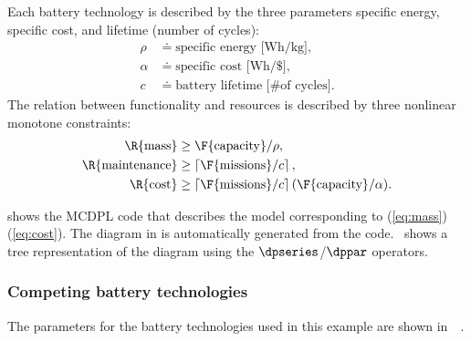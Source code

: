 Each battery technology is described by the three parameters specific
energy, specific cost, and lifetime (number of cycles):
\begin{align*}
\rho & \doteq\text{specific energy [Wh/kg]},\\
\alpha & \doteq\text{specific cost [Wh/\$]},\\
c & \doteq\text{battery lifetime [\# of cycles]}.
\end{align*}
The relation between functionality and resources is described by three
nonlinear monotone constraints: 
\begin{align}
\R{\text{mass}} & \geq\F{\text{capacity}}/\rho,\label{eq:mass}\\
\R{\text{maintenance}} & \geq\left\lceil \F{\text{missions}}/c\right\rceil ,\label{eq:maintenance}\\
\R{\text{cost}} & \geq\left\lceil \F{\text{missions}}/c\right\rceil (\F{\text{capacity}}/\alpha).\label{eq:cost}
\end{align}

 shows the MCDPL code that describes the
model corresponding to (\ref{eq:mass})\textendash (\ref{eq:cost}).
The diagram in  is automatically generated
from the code. ~shows a tree representation
of the diagram using the $\dpseries$/$\dppar$ operators. 

\subsubsection*{Competing battery technologies}

The parameters for the battery technologies used in this example are
shown in~~. 

